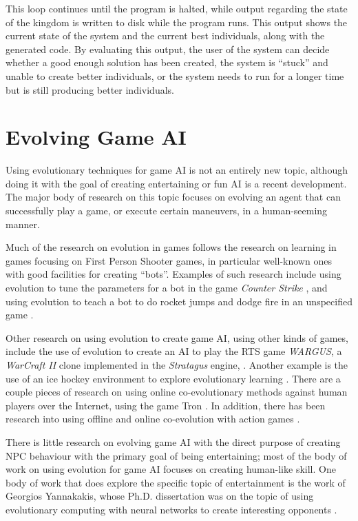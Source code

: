 This loop continues until the program is halted, while output regarding the
state of the kingdom is written to disk while the program runs. This output
shows the current state of the system and the current best individuals, along
with the generated code. By evaluating this output, the user of the system can
decide whether a good enough solution has been created, the system is ``stuck''
and unable to create better individuals, or the system needs to run for a longer
time but is still producing better individuals.

\section{Evolving Game AI}
\label{cha:game-ai-via}

Using evolutionary techniques for game AI is not an entirely new topic, although
doing it with the goal of creating entertaining or fun AI is a recent
development. The major body of research on this topic focuses on evolving an
agent that can successfully play a game, or execute certain maneuvers, in a
human-seeming manner.

Much of the research on evolution in games follows the research on learning in
games focusing on First Person Shooter games, in particular well-known ones with
good facilities for creating ``bots''. Examples of such research include using
evolution to tune the parameters for a bot in the game \emph{Counter Strike}
\citep{cole2004using}, and using evolution to teach a bot to do rocket jumps and
dodge fire in an unspecified game \citep{champandard2003ai}.

Other research on using evolution to create game AI, using other kinds of games,
include the use of evolution to create an AI to play the RTS game \emph{WARGUS},
a \emph{WarCraft II} clone implemented in the \emph{Stratagus} engine,
\citep{spronck2004difficulty}. Another example is the use of an ice hockey
environment to explore evolutionary learning \citep{blair1999exploring}. There
are a couple pieces of research on using online co-evolutionary methods against
human players over the Internet, using the game Tron
\citep{funes2000measuring,funes1998animal}. In addition, there has been research
into using offline and online co-evolution with action games
\citep{demasi2003online}.

There is little research on evolving game AI with the direct purpose of creating
NPC behaviour with the primary goal of being entertaining; most of the body of
work on using evolution for game AI focuses on creating human-like skill. One
body of work that does explore the specific topic of entertainment is the work
of Georgios Yannakakis, whose Ph.D. dissertation was on the topic of using
evolutionary computing with neural networks to create interesting opponents
\citep{yannakakis2005ai}.

